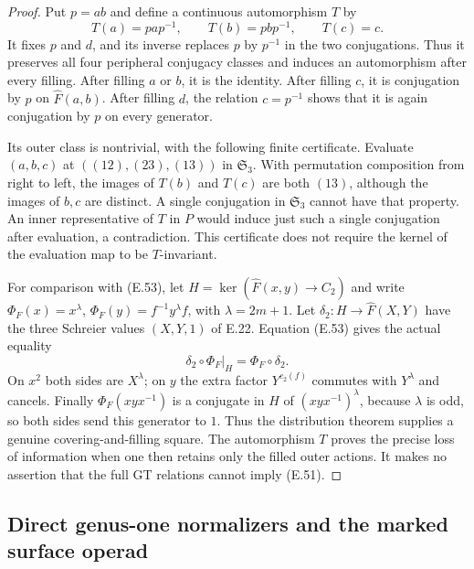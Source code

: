 \begin{proof}
Put $p=ab$ and define a continuous automorphism $T$ by
\[
 T(a)=pap^{-1},\qquad T(b)=pbp^{-1},\qquad T(c)=c.
\]
It fixes $p$ and $d$, and its inverse replaces $p$ by
$p^{-1}$ in the two conjugations.  Thus it preserves
all four peripheral conjugacy classes and induces an
automorphism after every filling.  After filling $a$
or $b$, it is the identity.  After filling $c$, it
is conjugation by $p$ on $\widehat F(a,b)$.  After
filling $d$, the relation $c=p^{-1}$ shows that it is
again conjugation by $p$ on every generator.

Its outer class is nontrivial, with the following finite
certificate.  Evaluate $(a,b,c)$ at
$((12),(23),(13))$ in $\mathfrak S_3$.  With permutation
composition from right to left, the images of $T(b)$
and $T(c)$ are both $(13)$, although the images of
$b,c$ are distinct.  A single conjugation in
$\mathfrak S_3$ cannot have that property.  An inner
representative of $T$ in $P$ would induce just such a
single conjugation after evaluation, a contradiction.
This certificate does not require the kernel of the
evaluation map to be $T$-invariant.

For comparison with (E.53), let
$H=\ker(\widehat F(x,y)\to C_2)$ and write
$\Phi_F(x)=x^\lambda$,
$\Phi_F(y)=f^{-1}y^\lambda f$, with $\lambda=2m+1$.
Let $\delta_2:H\to\widehat F(X,Y)$ have the three
Schreier values $(X,Y,1)$ of E.22.  Equation (E.53)
gives the actual equality
\[
 \delta_2\circ\Phi_F|_H
       =\Phi_F\circ\delta_2.                              \tag{E.60}
\]
On $x^2$ both sides are $X^\lambda$; on $y$ the
extra factor $Y^{c_2(f)}$ commutes with $Y^\lambda$
and cancels.  Finally $\Phi_F(xyx^{-1})$ is a
conjugate in $H$ of $(xyx^{-1})^\lambda$, because
$\lambda$ is odd, so both sides send this generator
to $1$.  Thus the distribution theorem supplies a
genuine covering-and-filling square.  The automorphism
$T$ proves the precise loss of information when one
then retains only the filled outer actions.  It makes
no assertion that the full GT relations cannot imply
(E.51).
\end{proof}

\subsection{Direct genus-one normalizers and the marked surface operad}

